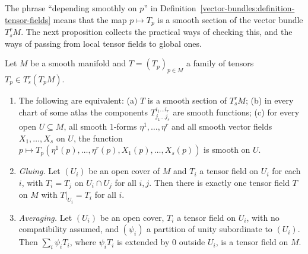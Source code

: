 The phrase ``depending smoothly on $p$'' in Definition~\ref{vector-bundles:definition-tensor-fields} means that the map $p \mapsto T_p$ is a smooth section of the vector bundle $T^r_sM$. The next proposition
collects the practical ways of checking this, and the ways of passing from local tensor fields to global ones.

\begin{proposition}\label{vector-bundles:proposition-tensor-fields-smooth}
Let $M$ be a smooth manifold and $T = (T_p)_{p \in M}$ a family of tensors $T_p \in T^r_s(T_pM)$.
\begin{enumerate}
\item The following are equivalent: (a) $T$ is a smooth section of $T^r_sM$; (b) in every chart of some atlas the components $T^{i_1 \ldots i_r}_{j_1 \ldots j_s}$ are smooth functions; (c) for every open $U \subseteq M$, all smooth
$1$-forms $\eta^1, \ldots, \eta^r$ and all smooth vector fields $X_1, \ldots, X_s$ on $U$, the function $p \mapsto T_p(\eta^1(p), \ldots, \eta^r(p), X_1(p), \ldots, X_s(p))$ is smooth on $U$.
\item \emph{Gluing.} Let $(U_i)$ be an open cover of $M$ and $T_i$ a tensor field on $U_i$ for each $i$, with $T_i = T_j$ on $U_i \cap U_j$ for all $i, j$. Then there is exactly one tensor field $T$ on $M$ with
$T|_{U_i} = T_i$ for all $i$.
\item \emph{Averaging.} Let $(U_i)$ be an open cover, $T_i$ a tensor field on $U_i$, with no compatibility assumed, and $(\psi_i)$ a partition of unity subordinate to $(U_i)$. Then
$\sum_i\psi_iT_i$, where $\psi_iT_i$ is extended by $0$ outside $U_i$, is a tensor field on $M$.
\end{enumerate}
\end{proposition}

